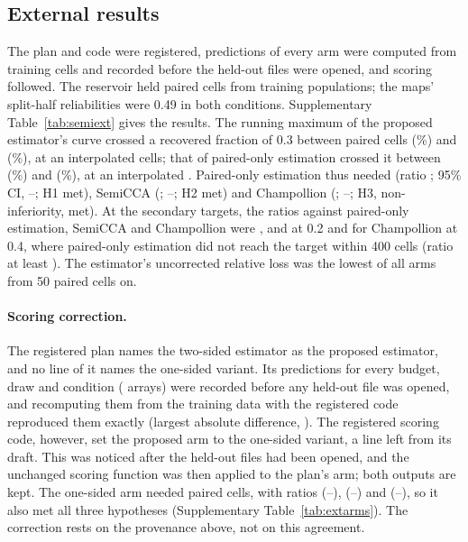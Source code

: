 \subsection*{External results}
The plan and code were registered, predictions of every arm were computed from training cells and recorded before the held-out files were opened, and scoring followed. The reservoir held \SpExReservoir{} paired cells from \SpExPoolPops{} training populations; the maps' split-half reliabilities were 0.49 in both conditions. Supplementary Table~\ref{tab:semiext} gives the results. The running maximum of the proposed estimator's curve crossed a recovered fraction of 0.3 between \SpExCrossProposedLoBudget{} paired cells (\SpExCrossProposedLoRf\%) and \SpExCrossProposedHiBudget{} (\SpExCrossProposedHiRf\%), at an interpolated \SpExCellsProposed{} cells; that of paired-only estimation crossed it between \SpExCrossPairedOnlyLoBudget{} (\SpExCrossPairedOnlyLoRf\%) and \SpExCrossPairedOnlyHiBudget{} (\SpExCrossPairedOnlyHiRf\%), at an interpolated \SpExCellsPairedOnly. Paired-only estimation thus needed \SpExCellsPairedOnly{} (ratio \SpExSavePairedOnly; 95\% CI, \SpExSavePairedOnlyLo--\SpExSavePairedOnlyHi; H1 met), SemiCCA \SpExCellsSemi{} (\SpExSaveSemi; \SpExSaveSemiLo--\SpExSaveSemiHi; H2 met) and Champollion \SpExCellsChamp{} (\SpExSaveChamp; \SpExSaveChampLo--\SpExSaveChampHi; H3, non-inferiority, met). At the secondary targets, the ratios against paired-only estimation, SemiCCA and Champollion were \SpExSavePairedOnlyTwo, \SpExSaveSemiTwo{} and \SpExSaveChampTwo{} at 0.2 and \SpExSaveChampFour{} for Champollion at 0.4, where paired-only estimation did not reach the target within 400 cells (ratio at least \SpExSavePairedOnlyFour). The estimator's uncorrected relative loss was the lowest of all arms from 50 paired cells on.

\paragraph{Scoring correction.} The registered plan names the two-sided estimator as the proposed estimator, and no line of it names the one-sided variant. Its predictions for every budget, draw and condition (\SpProvArrays{} arrays) were recorded before any held-out file was opened, and recomputing them from the training data with the registered code reproduced them exactly (largest absolute difference, \SpProvMaxDiff). The registered scoring code, however, set the proposed arm to the one-sided variant, a line left from its draft. This was noticed after the held-out files had been opened, and the unchanged scoring function was then applied to the plan's arm; both outputs are kept. The one-sided arm needed \SpExFrozenArmCells{} paired cells, with ratios \SpExFrozenArmPairedOnly{} (\SpExFrozenArmPairedOnlyLo--\SpExFrozenArmPairedOnlyHi), \SpExFrozenArmSemi{} (\SpExFrozenArmSemiLo--\SpExFrozenArmSemiHi) and \SpExFrozenArmChamp{} (\SpExFrozenArmChampLo--\SpExFrozenArmChampHi), so it also met all three hypotheses (Supplementary Table~\ref{tab:extarms}). The correction rests on the provenance above, not on this agreement.

